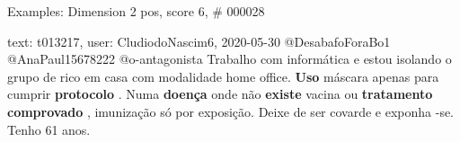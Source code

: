 \begin{frame}{Examples: Dimension 2 pos, score 6, \# 000028}
\footnotesize
\begin{exampleblock}{text: t013217, user: CludiodoNascim6, 2020-05-30}
@DesabafoForaBo1 @AnaPaul15678222 @o-antagonista Trabalho com informática e 
estou isolando o grupo de rico em casa com modalidade home office. \textbf{Uso} 
máscara apenas para cumprir \textbf{protocolo} . Numa \textbf{doença} onde não 
\textbf{existe} vacina ou \textbf{tratamento} \textbf{comprovado} , imunização 
só por exposição. Deixe de ser covarde e exponha -se. Tenho 61 anos. 
\end{exampleblock}
\end{frame}
